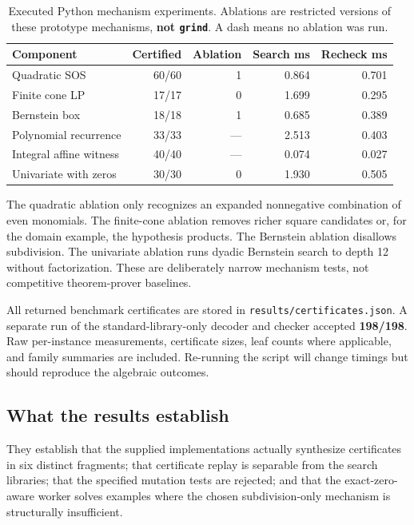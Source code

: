 \documentclass[11pt,a4paper]{article}
\theoremstyle{definition}
\newcommand{\grind}{\texttt{grind}}
\newcommand{\code}[1]{\texttt{#1}}
\begin{document}
\begin{table}[htbp]
\centering\small
\begin{tabular}{@{}lrrrr@{}}
\toprule
Component & Certified & Ablation & Search ms & Recheck ms \\
\midrule
Quadratic SOS & 60/60 & 1 & 0.864 & 0.701 \\
Finite cone LP & 17/17 & 0 & 1.699 & 0.295 \\
Bernstein box & 18/18 & 1 & 0.685 & 0.389 \\
Polynomial recurrence & 33/33 & --- & 2.513 & 0.403 \\
Integral affine witness & 40/40 & --- & 0.074 & 0.027 \\
Univariate with zeros & 30/30 & 0 & 1.930 & 0.505 \\
\bottomrule
\end{tabular}
\caption{Executed Python mechanism experiments. Ablations are restricted versions of these prototype mechanisms, \textbf{not \grind{}}. A dash means no ablation was run.}
\label{tab:results}
\end{table}

The quadratic ablation only recognizes an expanded nonnegative combination of even monomials. The finite-cone ablation removes richer square candidates or, for the domain example, the hypothesis products. The Bernstein ablation disallows subdivision. The univariate ablation runs dyadic Bernstein search to depth 12 without factorization. These are deliberately narrow mechanism tests, not competitive theorem-prover baselines.

All returned benchmark certificates are stored in \code{results/certificates.json}. A separate run of the standard-library-only decoder and checker accepted \textbf{198/198}. Raw per-instance measurements, certificate sizes, leaf counts where applicable, and family summaries are included. Re-running the script will change timings but should reproduce the algebraic outcomes.

\subsection{What the results establish}

They establish that the supplied implementations actually synthesize certificates in six distinct fragments; that certificate replay is separable from the search libraries; that the specified mutation tests are rejected; and that the exact-zero-aware worker solves examples where the chosen subdivision-only mechanism is structurally insufficient.
\end{document}
